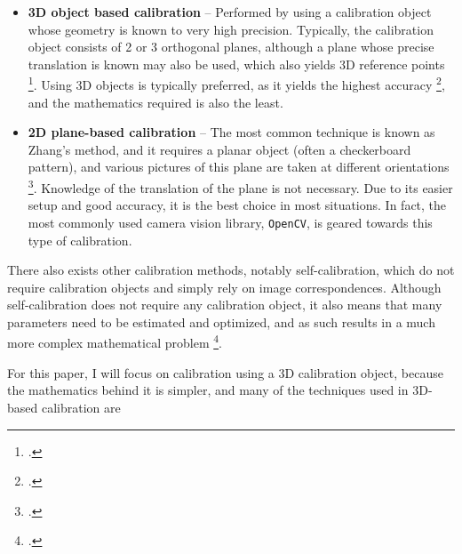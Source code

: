 \begin{itemize}[leftmargin=!, itemindent=-4ex]
    \item \textbf{3D object based calibration} -- Performed by using a calibration object whose geometry is known to very high precision. Typically, the calibration object consists of 2 or 3 orthogonal planes, although a plane whose precise translation is known may also be used, which also yields 3D reference points \footcite{zhangCameraCalibration2007}. Using 3D objects is typically preferred, as it yields the highest accuracy \footcite{zhangCameraCalibration2007}, and the mathematics required is also the least. 
    \item \textbf{2D plane-based calibration} -- The most common technique is known as Zhang's method, and it requires a planar object (often a checkerboard pattern), and various pictures of this plane are taken at different orientations \footcite{zhangFlexibleNew2000}. Knowledge of the translation of the plane is not necessary. Due to its easier setup and good accuracy, it is the best choice in most situations. In fact, the most commonly used camera vision library, \texttt{OpenCV}, is geared towards this type of calibration. 
\end{itemize}

There also exists other calibration methods, notably self-calibration, which do not require calibration objects and simply rely on image correspondences. Although self-calibration does not require any calibration object, it also means that many parameters need to be estimated and optimized, and as such results in a much more complex mathematical problem \footcite{zhangCameraCalibration2007}.

For this paper, I will focus on calibration using a 3D calibration object, because the mathematics behind it is simpler, and many of the techniques used in 3D-based calibration are 
